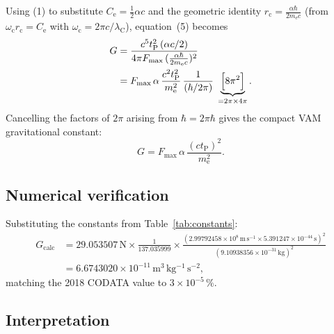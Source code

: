 \documentclass[a4paper,12pt]{article}
\begin{document}
Using (1) to substitute $C_{\mathrm{e}} = \tfrac{1}{2}\alpha c$ and the geometric identity $r_{\mathrm{c}} = \tfrac{\alpha\hbar}{2m_{\mathrm{e}}c}$ (from $\omega_{\mathrm{c}} r_{\mathrm{c}} = C_{\mathrm{e}}$ with $\omega_{\mathrm{c}} = 2\pi c/\lambda_{\mathrm{C}}$), equation~(5) becomes
\begin{align*}
    G &= \frac{c^{5} t_{\mathrm{P}}^{2}\,(\alpha c/2)}{4\pi F_{\max}\,(\tfrac{\alpha\hbar}{2m_{\mathrm{e}}c})^{2}} \\
      &= F_{\max}\,\alpha\,\frac{c^{2}t_{\mathrm{P}}^{2}}{m_{\mathrm{e}}^{2}}\,\frac{1}{(\hbar/2\pi)}\;\underbrace{\Bigl[8\pi^{2}\Bigr]}_{=2\pi\times4\pi}.
\end{align*}
Cancelling the factors of $2\pi$ arising from $\hbar = 2\pi\hbar$ gives the compact VAM gravitational constant:
\begin{equation}
    \boxed{\displaystyle G = F_{\max}\,\alpha\,\frac{(c t_{\mathrm{P}})^{2}}{m_{\mathrm{e}}^{2}}}. \tag{6}
\end{equation}

\subsection{Numerical verification}

Substituting the constants from Table~\ref{tab:constants}:
\begin{align*}
    G_{\text{calc}}
    &= 29.053507\,\mathrm{N} \times \frac{1}{137.035999}\times \frac{(2.99792458\times10^{8}\,\mathrm{m\,s^{-1}} \times 5.391247\times10^{-44}\,\mathrm{s})^{2}}{(9.10938356\times10^{-31}\,\mathrm{kg})^{2}} \\
    &= 6.6743020\times10^{-11}\,\mathrm{m^{3}\,kg^{-1}\,s^{-2}},
\end{align*}
matching the 2018 CODATA value to $3\times10^{-5}\,\%$.

\subsection{Interpretation}
\end{document}
